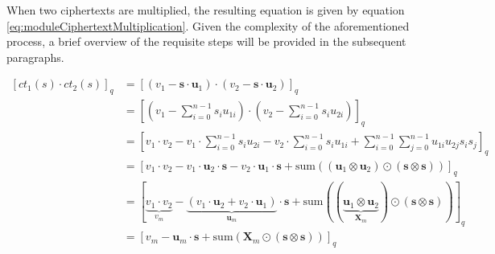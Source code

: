 When two ciphertexts are multiplied, the resulting equation is given by equation \ref{eq:moduleCiphertextMultiplication}. Given the complexity of the aforementioned process, a brief overview of the requisite steps will be provided in the subsequent paragraphs.

\begin{equation}
  \begin{split}
    [ct_1(s)\cdot ct_2(s)]_q & = [(v_1-\textbf{s}\cdot \textbf{u}_1) \cdot (v_2-\textbf{s}\cdot \textbf{u}_2)]_q                                                                                                                                                                       \\
                             & = [(v_1-\sum_{i=0}^{n-1}s_iu_{1i}) \cdot (v_2-\sum_{i=0}^{n-1}s_iu_{2i})]_q                                                                                                                                                                             \\
                             & = [v_1\cdot v_2 - v_1\cdot \sum_{i=0}^{n-1}s_iu_{2i}- v_2\cdot \sum_{i=0}^{n-1}s_iu_{1i} + \sum_{i=0}^{n-1}\sum_{j=0}^{n-1}u_{1i}u_{2j}s_is_j]_q                                                                                                        \\    
                             & = [v_1\cdot v_2 - v_1\cdot \textbf{u}_2\cdot \textbf{s} - v_2\cdot \textbf{u}_1\cdot \textbf{s} + \mathrm{sum}((\textbf{u}_{1}\otimes\textbf{u}_{2})\odot(\textbf{s}\otimes\textbf{s}))]_q                                                              \\
                             & = [\underbrace{v_1\cdot v_2}_{v_m} - \underbrace{(v_1\cdot \textbf{u}_2 + v_2\cdot \textbf{u}_1)}_{\textbf{u}_m}\cdot \textbf{s} + \mathrm{sum}((\underbrace{\textbf{u}_{1}\otimes\textbf{u}_{2}}_{\textbf{X}_m})\odot(\textbf{s}\otimes\textbf{s}))]_q \\
                             & = [v_m - \textbf{u}_m\cdot \textbf{s} + \mathrm{sum}(\textbf{X}_m\odot(\textbf{s}\otimes\textbf{s}))]_q
  \end{split}
  \label{eq:moduleCiphertextMultiplication}
\end{equation}

